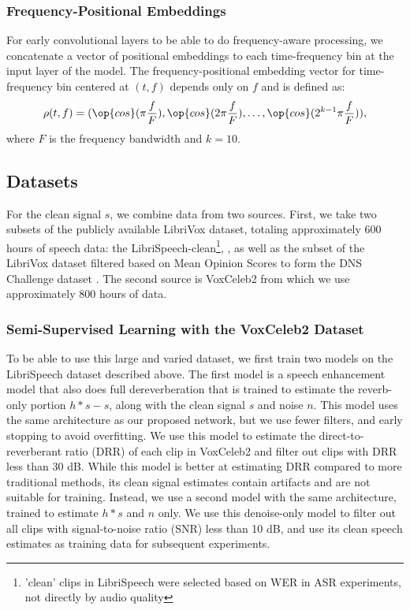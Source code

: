 \documentclass[english]{article}
\begin{document}
\subsubsection{Frequency-Positional Embeddings} For early convolutional layers to be able to do frequency-aware processing, we concatenate a vector of positional embeddings to each time-frequency bin at the input layer of the model. The frequency-positional embedding vector for time-frequency bin centered at $(t, f)$ depends only on $f$ and is defined as:
$$\rho(t, f) = (\op{cos}(\pi \frac{f}{F}), \op{cos}(2\pi \frac{f}{F}), \dots, \op{cos}(2^{k-1}\pi \frac{f}{F})),$$
where $F$ is the frequency bandwidth and $k=10$. 


\subsection{Datasets}

For the clean signal $s$, we combine data from two sources. First, we take two subsets of the publicly available LibriVox dataset, totaling approximately 600 hours of speech data: the LibriSpeech-clean\footnote{'clean' clips in LibriSpeech were selected based on WER in ASR experiments, not directly by audio quality}, \cite{librispeech}, as well as the subset of the LibriVox dataset filtered based on Mean Opinion Scores to form the DNS Challenge dataset \cite{dnschallenge}. The second source is VoxCeleb2 from which we use approximately 800 hours of data.

\subsubsection{Semi-Supervised Learning with the VoxCeleb2 Dataset} To be able to use this large and varied dataset, we first train two models on the LibriSpeech dataset described above. The first model is a speech enhancement model that also does full dereverberation that is trained to estimate the reverb-only portion $h * s - s$, along with the clean signal $s$ and noise $n$. This model uses the same architecture as our proposed network, but we use fewer filters, and early stopping to avoid overfitting. We use this model to estimate the direct-to-reverberant ratio (DRR) of each clip in VoxCeleb2 and filter out clips with DRR less than 30 dB. While this model is better at estimating DRR compared to more traditional methods, its clean signal estimates contain artifacts and are not suitable for training. Instead, we use a second model with the same architecture, trained to estimate $h * s$ and $n$ only. We use this denoise-only model to filter out all clips with signal-to-noise ratio (SNR) less than 10 dB, and use its clean speech estimates as training data for subsequent experiments. 
\end{document}
